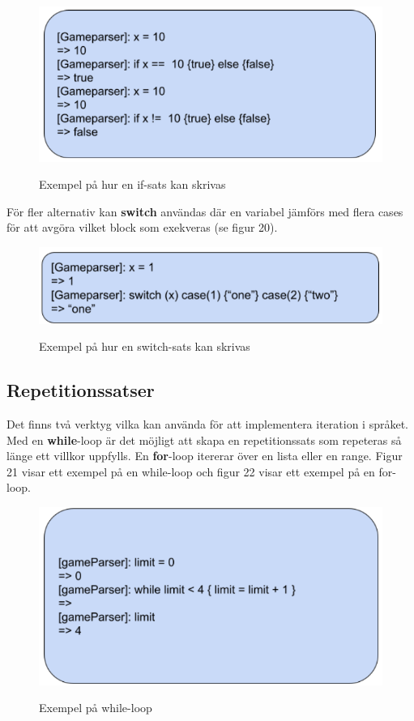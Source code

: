 \documentclass{Dokumentmall}
\begin{document}
\begin{figure}[h!]
  \centering
  \includegraphics[scale = 0.65]{Images/Figur19.png}
  \label{}
  \caption{Exempel på hur en if-sats kan skrivas}
\end{figure}

\newpage
För fler alternativ kan \textbf{switch} användas där en variabel jämförs med flera cases för att avgöra vilket block som exekveras (se figur 20).

\begin{figure}[h!]
  \centering
  \includegraphics[scale = 0.65]{Images/Figur20.png}
  \label{}
  \caption{Exempel på hur en switch-sats kan skrivas}
\end{figure}


\subsection{Repetitionssatser}
Det finns två verktyg vilka kan använda för att implementera iteration i språket. Med en \textbf{while}-loop är det möjligt att skapa en repetitionssats som repeteras så länge ett villkor uppfylls. En \textbf{for}-loop itererar över en lista eller en range. Figur 21 visar ett exempel på en while-loop och figur 22 visar ett exempel på en for-loop.

\begin{figure}[h!]
  \centering
  \includegraphics[scale = 0.65]{Images/Figur21.png}
  \label{}
  \caption{Exempel på while-loop}
\end{figure}
\end{document}
